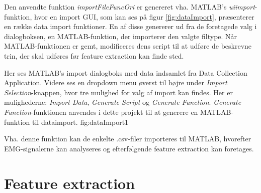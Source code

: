 Den anvendte funktion \textit{importFileFuncOri} er genereret vha. MATLAB's \textit{uiimport}-funktion\citep{matlabUiimport}, hvor en import GUI, som kan ses på figur \ref{fig:dataImport}, præsenterer en række data import funktioner. En af disse genererer ud fra de foretagede valg i dialogboksen, en MATLAB-funktion, der importerer den valgte filtype. Når MATLAB-funktionen er gemt, modificeres dens script til at udføre de beskrevne trin, der skal udføres før feature extraction kan finde sted.

{
	Her ses MATLAB's import dialogboks med data indsamlet fra Data Collection Application. Videre ses en dropdown menu øverst til højre under \textit{Import Selection}-knappen, hvor tre mulighed for valg af import kan findes. Her er mulighederne: \textit{Import Data}, \textit{Generate Script} og \textit{Generate Function}. \textit{Generate Function}-funktionen anvendes i dette projekt til at generere en MATLAB-funktion til dataimport.
 }{fig:dataImport}{1}

Vha. denne funktion kan de enkelte .csv-filer importeres til MATLAB, hvorefter EMG-signalerne kan analyseres og efterfølgende feature extraction kan foretages.

\section{Feature extraction}

